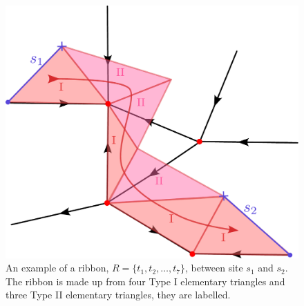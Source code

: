 \documentclass[two column]{article}
\newcommand{\caro}[1]{\textcolor{red}{[#1]}}
\begin{document}
\begin{figure}
    \centering
    \includegraphics[width= \linewidth]{Figures/ribbon_exmpl.pdf}
    \caption{An example of a ribbon, $R = \{t_1, t_2, \ldots, t_7\}$, between site $s_1$ and $s_2$. The ribbon is made up from four Type I elementary triangles and three Type II elementary triangles, they are labelled.}
    \label{fig:rib_exampl}
\end{figure}


\end{document}
